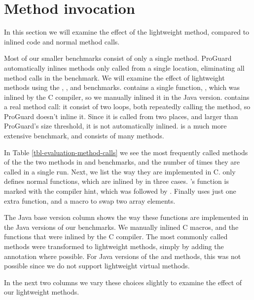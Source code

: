 \section{Method invocation}
\label{sec-evaluation-method-invocation}


In this section we will examine the effect of the lightweight method, compared to inlined code and normal method calls.

Most of our smaller benchmarks consist of only a single method. ProGuard automatically inlines methods only called from a single location, eliminating all method calls in the  benchmark. We will examine the effect of lightweight methods using the , , and  benchmarks.
 contains a single function, , which was inlined by the C compiler, so we manually inlined it in the Java version.  contains a real method call: it consist of two loops, both repeatedly calling the  method, so ProGuard doesn't inline it. Since it is called from two places, and larger than ProGuard's size threshold, it is not automatically inlined. is a much more extensive benchmark, and consists of many methods.

In Table \ref{tbl-evaluation-method-calls} we see the most frequently called methods of the  the two methods in  and  benchmarks, and the number of times they are called in a single run. Next, we list the way they are implemented in C. only defines normal functions, which are inlined by  in three cases. 's  function is marked with the  compiler hint, which was followed by . Finally  uses just one extra function, and a macro to swap two array elements.

The Java base version column shows the way these functions are implemented in the Java versions of our benchmarks. We manually inlined C macros, and the functions that were inlined by the C compiler. The most commonly called methods were transformed to lightweight methods, simply by adding the  annotation where possible. For Java versions of the  and  methods, this was not possible since we do not support lightweight virtual methods.

In the next two columns we vary these choices slightly to examine the effect of our lightweight methods.

